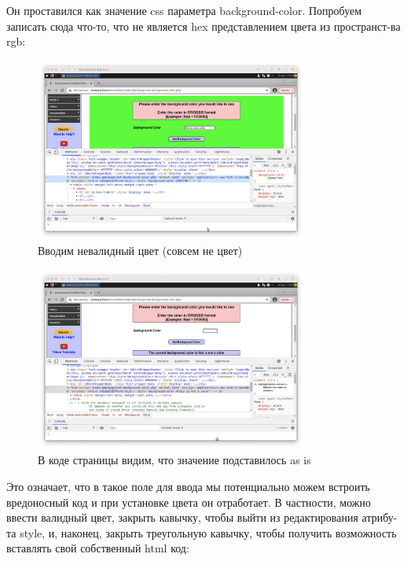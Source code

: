 \documentclass[a4paper]{article}
\begin{document}
  Он проставился как значение css параметра background-color. Попробуем записать
  сюда что-то, что не является hex представлением цвета из пространст-ва rgb:

  \begin{figure}[H]
    \centering
    \includegraphics[width=0.8\textwidth]{step_00008}
    \caption{Вводим невалидный цвет (совсем не цвет)}
  \end{figure}

  \begin{figure}[H]
    \centering
    \includegraphics[width=0.8\textwidth]{step_00009}
    \caption{В коде страницы видим, что значение подставилось as is}
  \end{figure}

  Это означает, что в такое поле для ввода мы потенциально можем встроить вредоносный код
  и при установке цвета он отработает. В частности, можно ввести валидный цвет, закрыть
  кавычку, чтобы выйти из редактирования атрибу-та style, и, наконец, закрыть треугольную
  кавычку, чтобы получить возможность вставлять свой собственный html код:
\end{document}
